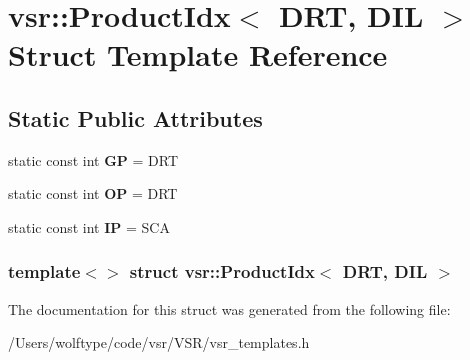 \hypertarget{structvsr_1_1_product_idx_3_01_d_r_t_00_01_d_i_l_01_4}{\section{vsr\-:\-:Product\-Idx$<$ D\-R\-T, D\-I\-L $>$ Struct Template Reference}
\label{structvsr_1_1_product_idx_3_01_d_r_t_00_01_d_i_l_01_4}
}
\subsection*{Static Public Attributes}
\begin{DoxyCompactItemize}
\item 
\hypertarget{structvsr_1_1_product_idx_3_01_d_r_t_00_01_d_i_l_01_4_a4163baf313cf6cde3ec4969d6b4aa210}{static const int {\bfseries G\-P} = D\-R\-T}\label{structvsr_1_1_product_idx_3_01_d_r_t_00_01_d_i_l_01_4_a4163baf313cf6cde3ec4969d6b4aa210}

\item 
\hypertarget{structvsr_1_1_product_idx_3_01_d_r_t_00_01_d_i_l_01_4_a2d27950176a850eb810f63f552274571}{static const int {\bfseries O\-P} = D\-R\-T}\label{structvsr_1_1_product_idx_3_01_d_r_t_00_01_d_i_l_01_4_a2d27950176a850eb810f63f552274571}

\item 
\hypertarget{structvsr_1_1_product_idx_3_01_d_r_t_00_01_d_i_l_01_4_abfb53d5b393a09ceac2ce288b18182f8}{static const int {\bfseries I\-P} = S\-C\-A}\label{structvsr_1_1_product_idx_3_01_d_r_t_00_01_d_i_l_01_4_abfb53d5b393a09ceac2ce288b18182f8}

\end{DoxyCompactItemize}
\subsubsection*{template$<$$>$ struct vsr\-::\-Product\-Idx$<$ D\-R\-T, D\-I\-L $>$}



The documentation for this struct was generated from the following file\-:\begin{DoxyCompactItemize}
\item 
/\-Users/wolftype/code/vsr/\-V\-S\-R/vsr\-\_\-templates.\-h\end{DoxyCompactItemize}
